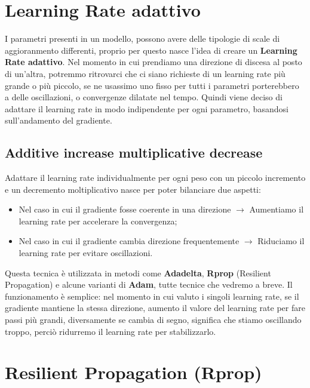 \section{Learning Rate adattivo}
I parametri presenti in un modello, possono avere delle tipologie di scale di aggioranmento differenti, proprio per questo nasce l'idea di creare un \textbf{Learning Rate adattivo}. Nel momento in cui prendiamo una direzione di discesa al posto di un'altra, potremmo ritrovarci che ci siano richieste di un learning rate più grande o più piccolo, se ne usassimo uno fisso per tutti i parametri porterebbero a delle oscillazioni, o convergenze dilatate nel tempo. Quindi viene deciso di adattare il learning rate in modo indipendente per ogni parametro, basandosi sull'andamento del gradiente.

\subsection{Additive increase multiplicative decrease}
Adattare il learning rate individualmente per ogni peso con un piccolo incremento e un decremento moltiplicativo nasce per poter bilanciare due aspetti:
\begin{itemize}
    \item Nel caso in cui il gradiente fosse coerente in una direzione $\rightarrow$ Aumentiamo il learning rate per accelerare la convergenza;
    \item Nel caso in cui il gradiente cambia direzione frequentemente $\rightarrow$ Riduciamo il learning rate per evitare oscillazioni.
\end{itemize}

Questa tecnica è utilizzata in metodi come \textbf{Adadelta}, \textbf{Rprop} (Resilient Propagation) e alcune varianti di \textbf{Adam}, tutte tecnice che vedremo a breve. Il funzionamento è semplice: nel momento in cui valuto i singoli learning rate, se il gradiente mantiene la stessa direzione, aumento il valore del learning rate per fare passi più grandi, diversamente se cambia di segno, significa che stiamo oscillando troppo, perciò ridurremo il learning rate per stabilizzarlo.

\section{Resilient Propagation (Rprop)}

